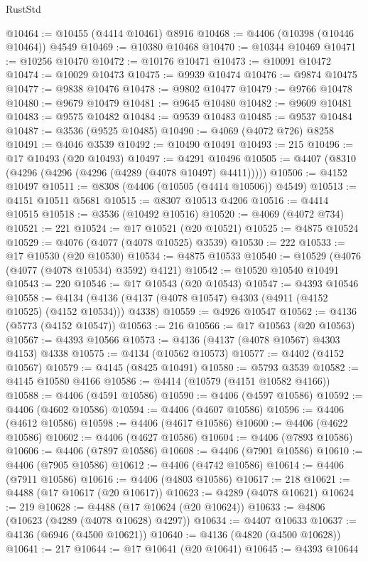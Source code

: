 \begin{lexlean}{RustStd}
\begin{coremodule}
@10464 := @10455 (@4414 @10461) @8916
@10468 := @4406 (@10398 (@10446 @10464)) @4549
@10469 := @10380 @10468
@10470 := @10344 @10469
@10471 := @10256 @10470
@10472 := @10176 @10471
@10473 := @10091 @10472
@10474 := @10029 @10473
@10475 := @9939 @10474
@10476 := @9874 @10475
@10477 := @9838 @10476
@10478 := @9802 @10477
@10479 := @9766 @10478
@10480 := @9679 @10479
@10481 := @9645 @10480
@10482 := @9609 @10481
@10483 := @9575 @10482
@10484 := @9539 @10483
@10485 := @9537 @10484
@10487 := @3536 (@9525 @10485)
@10490 := @4069 (@4072 @726) @8258
@10491 := @4046 @3539
@10492 := @10490 @10491
@10493 := 215
@10496 := @17 @10493 (@20 @10493)
@10497 := @4291 @10496
@10505 := @4407 (@8310 (@4296 (@4296 (@4296 (@4289 (@4078 @10497) @4411)))))
@10506 := @4152 @10497
@10511 := @8308 (@4406 (@10505 (@4414 @10506)) @4549)
@10513 := @4151 @10511 @5681
@10515 := @8307 @10513 @4206
@10516 := @4414 @10515
@10518 := @3536 (@10492 @10516)
@10520 := @4069 (@4072 @734)
@10521 := 221
@10524 := @17 @10521 (@20 @10521)
@10525 := @4875 @10524
@10529 := @4076 (@4077 (@4078 @10525) @3539)
@10530 := 222
@10533 := @17 @10530 (@20 @10530)
@10534 := @4875 @10533
@10540 := @10529 (@4076 (@4077 (@4078 @10534) @3592) @4121)
@10542 := @10520 @10540 @10491
@10543 := 220
@10546 := @17 @10543 (@20 @10543)
@10547 := @4393 @10546
@10558 := @4134 (@4136 (@4137 (@4078 @10547) @4303 (@4911 (@4152 @10525) (@4152 @10534))) @4338)
@10559 := @4926 @10547
@10562 := @4136 (@5773 (@4152 @10547))
@10563 := 216
@10566 := @17 @10563 (@20 @10563)
@10567 := @4393 @10566
@10573 := @4136 (@4137 (@4078 @10567) @4303 @4153) @4338
@10575 := @4134 (@10562 @10573)
@10577 := @4402 (@4152 @10567)
@10579 := @4145 (@8425 @10491)
@10580 := @5793 @3539
@10582 := @4145 @10580 @4166
@10586 := @4414 (@10579 (@4151 @10582 @4166))
@10588 := @4406 (@4591 @10586)
@10590 := @4406 (@4597 @10586)
@10592 := @4406 (@4602 @10586)
@10594 := @4406 (@4607 @10586)
@10596 := @4406 (@4612 @10586)
@10598 := @4406 (@4617 @10586)
@10600 := @4406 (@4622 @10586)
@10602 := @4406 (@4627 @10586)
@10604 := @4406 (@7893 @10586)
@10606 := @4406 (@7897 @10586)
@10608 := @4406 (@7901 @10586)
@10610 := @4406 (@7905 @10586)
@10612 := @4406 (@4742 @10586)
@10614 := @4406 (@7911 @10586)
@10616 := @4406 (@4803 @10586)
@10617 := 218
@10621 := @4488 (@17 @10617 (@20 @10617))
@10623 := @4289 (@4078 @10621)
@10624 := 219
@10628 := @4488 (@17 @10624 (@20 @10624))
@10633 := @4806 (@10623 (@4289 (@4078 @10628) @4297))
@10634 := @4407 @10633
@10637 := @4136 (@6946 (@4500 @10621))
@10640 := @4136 (@4820 (@4500 @10628))
@10641 := 217
@10644 := @17 @10641 (@20 @10641)
@10645 := @4393 @10644

\end{coremodule}
\end{lexlean}

